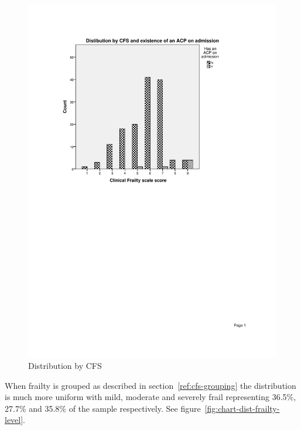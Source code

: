 \documentclass
[
	12pt,
	a4paper,
	oneside,
]{report}
\begin{document}
\begin{figure}[ht]
\caption{Distribution by CFS}
\label{fig:chart-dist-cfs}
\includegraphics[width=\textwidth,
	trim={2.5cm 14cm 2.5cm 2.5cm},
	clip]{media/chart-dist-cfs}
\end{figure}

When frailty is grouped as described in section~\ref{ref:cfs-grouping} the 
distribution is much more uniform with mild, moderate and severely frail
representing 36.5\%, 27.7\% and 35.8\% of the sample respectively.
See figure~\ref{fig:chart-dist-frailty-level}.
\end{document}
